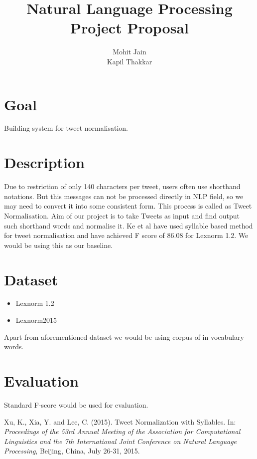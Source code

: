 \documentclass{article}
\title{Natural Language Processing \\
Project Proposal}
\author{Mohit Jain \\
Kapil Thakkar}
\date{}
\begin{document}
\maketitle

\section{Goal}

Building system for tweet normalisation. 

\section{Description}

Due to restriction of only 140 characters per tweet, users often use shorthand notations. But this messages can not be processed directly in NLP field, so we may need to convert it into some consistent form. This process is called as Tweet Normalisation. Aim of our project is to take Tweets as input and find output such shorthand words and normalise it. Ke et al \cite{1} have used syllable based method for tweet normalisation and have achieved F score of 86.08 for Lexnorm 1.2. We would be using this as our baseline.  

\section{Dataset}

\begin{itemize}
 \item Lexnorm 1.2
 \item Lexnorm2015
\end{itemize}

Apart from aforementioned dataset we would be using corpus of in vocabulary words.
 
\section{Evaluation}

Standard F-score would be used for evaluation.


\begin{thebibliography}{9}

Xu, K., Xia, Y. and Lee, C. (2015). Tweet Normalization with Syllables. In: \textit{Proceedings of the 53rd Annual Meeting of the Association for Computational Linguistics and the 7th International Joint Conference on Natural Language Processing}, Beijing, China, July 26-31, 2015.

\end{thebibliography}
 
\end{document}
